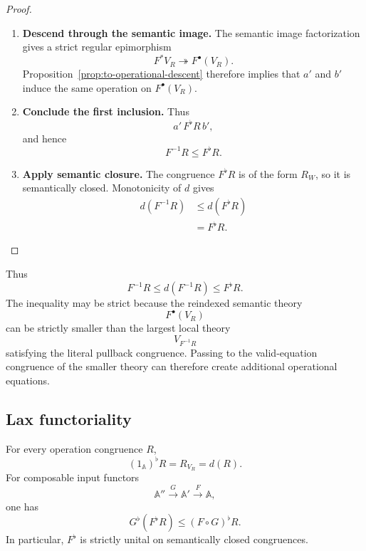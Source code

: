 \begin{proof}
\begin{enumerate}
        \item \textbf{Descend through the semantic image.}
        The semantic image factorization gives a strict regular epimorphism
        \[
            F^*V_R
            \twoheadrightarrow
            F^\bullet(V_R).
        \]
        Proposition~\ref{prop:to-operational-descent} therefore implies that
        \(a'\) and \(b'\) induce the same operation on
        \(F^\bullet(V_R)\).

        \item \textbf{Conclude the first inclusion.}
        Thus
        \[
            a'\,F^\flat R\,b',
        \]
        and hence
        \[
            F^{-1}R\leq F^\flat R.
        \]

        \item \textbf{Apply semantic closure.}
        The congruence \(F^\flat R\) is of the form \(R_W\), so it is
        semantically closed. Monotonicity of \(d\) gives
        \[
        \begin{aligned}
            d(F^{-1}R)
            &\leq
            d(F^\flat R)
            \\
            &=
            F^\flat R.
        \end{aligned}
        \]
    \end{enumerate}
\end{proof}

Thus
\[
    F^{-1}R
    \leq
    d(F^{-1}R)
    \leq
    F^\flat R.
\]
The inequality may be strict because the reindexed semantic theory
\[
    F^\bullet(V_R)
\]
can be strictly smaller than the largest local theory
\[
    V_{F^{-1}R}
\]
satisfying the literal pullback congruence. Passing to the valid-equation
congruence of the smaller theory can therefore create additional operational
equations.

\subsection{Lax functoriality}
\label{subsec:to-Fflat-lax-functoriality}

\begin{proposition}
\label{prop:to-Fflat-lax-composition}
    For every operation congruence \(R\),
    \[
        (1_{\mathbb A})^\flat R
        =
        R_{V_R}
        =
        d(R).
    \]
    For composable input functors
    \[
        \mathbb A''
        \xrightarrow{G}
        \mathbb A'
        \xrightarrow{F}
        \mathbb A,
    \]
    one has
    \[
        G^\flat(F^\flat R)
        \leq
        (F\circ G)^\flat R.
    \]
    In particular, \(F^\flat\) is strictly unital on semantically closed
    congruences.
\end{proposition}

